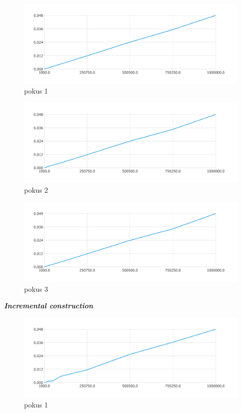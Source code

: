 \documentclass{article}
\begin{document}
\begin{figure}[htbp]
\centering
        \includegraphics[clip, trim=0cm 0cm 0cm 0cm, width=1\textwidth]{pdf22.pdf}
        \caption{pokus 1}
\end{figure}
\begin{figure}[htbp]
\centering
        \includegraphics[clip, trim=0cm 0cm 0cm 0cm, width=1\textwidth]{pdf23.pdf}
        \caption{pokus 2}
\end{figure}
\begin{figure}[htbp]
\centering
        \includegraphics[clip, trim=0cm 0cm 0cm 0cm, width=1\textwidth]{pdf24.pdf}
        \caption{pokus 3}
\end{figure}
\clearpage
\newpage
\textit{\textbf {Incremental construction}}
\\
\begin{figure}[htbp]
\centering
        \includegraphics[clip, trim=0cm 0cm 0cm 0cm, width=1\textwidth]{pdf25.pdf}
        \caption{pokus 1}
\end{figure}
\end{document}
